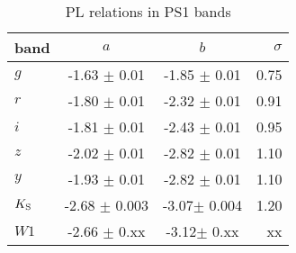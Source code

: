 \begin{table}[htdp]
\caption{PL relations in PS1 bands}
\begin{center}
\begin{tabular}{lccr}
band & $a$ &  $b$ &  $\sigma$\\
\hline \hline
$g$&     -1.63 $\pm$    0.01 &      -1.85 $\pm$    0.01 &     0.75 \\
$r$  &   -1.80 $\pm$    0.01 &      -2.32 $\pm$    0.01 &     0.91 \\
$i$   &  -1.81 $\pm$   0.01 &      -2.43 $\pm$   0.01 &       0.95 \\
$z$   &  -2.02 $\pm$   0.01 &      -2.82 $\pm$   0.01 &       1.10 \\
$y$    & -1.93 $\pm$   0.01 &      -2.82 $\pm$   0.01 &       1.10 \\
$K_{\rm{S}}$ &    -2.68 $\pm$   0.003 &      -3.07$\pm$   0.004 &       1.20\\
$ W1 $ &  -2.66 $\pm$   0.xx &      -3.12$\pm$   0.xx &       xx\\
 \end{tabular}
\end{center}
\label{default}
\end{table}%